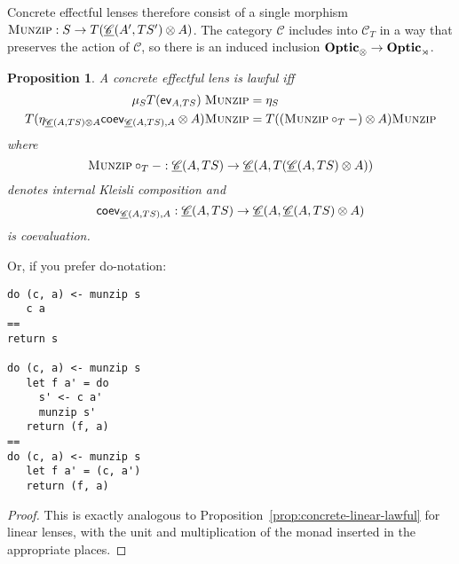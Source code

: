 \documentclass[11pt,letterpaper]{article}
\theoremstyle{plain}
\newtheorem{proposition}[theorem]{Proposition}
\theoremstyle{definition}
\newcommand{\C}{\mathscr{C}}
\newcommand{\homC}{\underline{\C}}
\newcommand{\Optic}{\mathbf{Optic}}
\newcommand{\munzip}{\textsc{Munzip}}
\begin{document}
Concrete effectful lenses therefore consist of a single morphism $\munzip : S \to T(\homC(A', T S') \otimes A)$. The category $\C$ includes into $\C_T$ in a way that preserves the action of $\C$, so there is an induced inclusion $\Optic_\otimes \to \Optic_\monact$.

\begin{proposition}
A concrete effectful lens is lawful iff
  \begin{align*}
    \mu_S T(\ev_{A, TS}) \; \munzip &= \eta_S \\
    T(\eta_{\homC(A, TS) \otimes A}\coev_{\homC(A, TS), A} \otimes A)\munzip &= T((\munzip \circ_T -) \otimes A)\munzip
  \end{align*}
  where \[ \munzip \circ_T - : \homC(A, TS) \to \homC(A, T(\homC(A, TS) \otimes A)) \] denotes internal Kleisli composition and \[\coev_{\homC(A, TS), A} : \homC(A, TS) \to \homC(A, \homC(A, TS) \otimes A) \] is coevaluation.
\end{proposition}
  Or, if you prefer do-notation:
\begin{verbatim}
do (c, a) <- munzip s
   c a
==
return s

do (c, a) <- munzip s
   let f a' = do
     s' <- c a'
     munzip s'
   return (f, a)
==
do (c, a) <- munzip s
   let f a' = (c, a')
   return (f, a)
\end{verbatim}
\begin{proof}
This is exactly analogous to Proposition~\ref{prop:concrete-linear-lawful} for linear lenses, with the unit and multiplication of the monad inserted in the appropriate places.
\end{proof}
\end{document}
